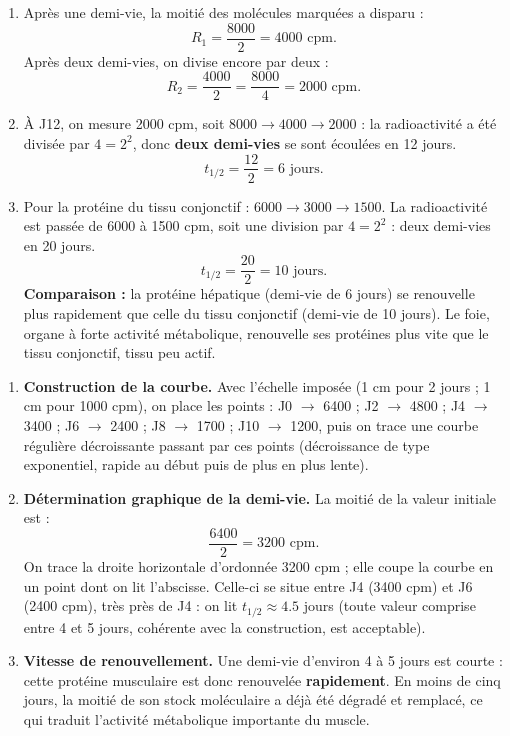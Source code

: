 \documentclass[11pt]{article}
\begin{document}
\begin{corrige}
\begin{enumerate}
\item Après une demi-vie, la moitié des molécules marquées a disparu :
\[ R_1 = \frac{8000}{2} = \num{4000} \text{ cpm}. \]
Après deux demi-vies, on divise encore par deux :
\[ R_2 = \frac{4000}{2} = \frac{8000}{4} = \num{2000} \text{ cpm}. \]

\item À J12, on mesure \num{2000} cpm, soit $8000 \rightarrow 4000 \rightarrow 2000$ : la radioactivité a été divisée par $4 = 2^2$, donc \textbf{deux demi-vies} se sont écoulées en 12 jours.
\[ t_{1/2} = \frac{12}{2} = 6 \text{ jours}. \]

\item Pour la protéine du tissu conjonctif : $6000 \rightarrow 3000 \rightarrow 1500$. La radioactivité est passée de \num{6000} à \num{1500} cpm, soit une division par $4 = 2^2$ : deux demi-vies en 20 jours.
\[ t_{1/2} = \frac{20}{2} = 10 \text{ jours}. \]
\textbf{Comparaison :} la protéine hépatique (demi-vie de 6 jours) se renouvelle plus rapidement que celle du tissu conjonctif (demi-vie de 10 jours). Le foie, organe à forte activité métabolique, renouvelle ses protéines plus vite que le tissu conjonctif, tissu peu actif.
\end{enumerate}
\end{corrige}

\begin{corrige}
\begin{enumerate}
\item \textbf{Construction de la courbe.} Avec l'échelle imposée (1 cm pour 2 jours ; 1 cm pour 1000 cpm), on place les points : J0 $\rightarrow$ 6400 ; J2 $\rightarrow$ 4800 ; J4 $\rightarrow$ 3400 ; J6 $\rightarrow$ 2400 ; J8 $\rightarrow$ 1700 ; J10 $\rightarrow$ 1200, puis on trace une courbe régulière décroissante passant par ces points (décroissance de type exponentiel, rapide au début puis de plus en plus lente).

\item \textbf{Détermination graphique de la demi-vie.} La moitié de la valeur initiale est :
\[ \frac{6400}{2} = \num{3200} \text{ cpm}. \]
On trace la droite horizontale d'ordonnée 3200 cpm ; elle coupe la courbe en un point dont on lit l'abscisse. Celle-ci se situe entre J4 (3400 cpm) et J6 (2400 cpm), très près de J4 : on lit $t_{1/2} \approx \num{4,5}$ jours (toute valeur comprise entre 4 et 5 jours, cohérente avec la construction, est acceptable).

\item \textbf{Vitesse de renouvellement.} Une demi-vie d'environ 4 à 5 jours est courte : cette protéine musculaire est donc renouvelée \textbf{rapidement}. En moins de cinq jours, la moitié de son stock moléculaire a déjà été dégradé et remplacé, ce qui traduit l'activité métabolique importante du muscle.
\end{enumerate}
\end{corrige}
\end{document}
